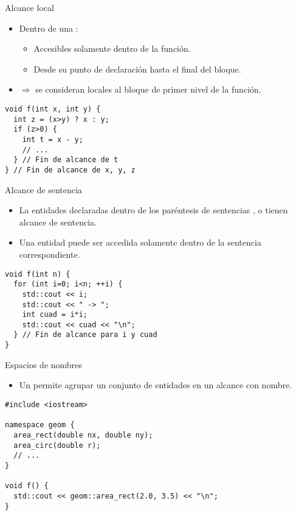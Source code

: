 \begin{frame}[t,fragile]{Alcance local}
\begin{itemize}
  \item Dentro de una :
    \begin{itemize}
      \item Accesibles solamente dentro de la función.
      \item Desde su punto de declaración hasta el final del bloque.
    \end{itemize}
  \item {} $\Rightarrow$ se consideran 
        locales al bloque de primer nivel de la función.
\end{itemize}
\begin{lstlisting}
void f(int x, int y) {
  int z = (x>y) ? x : y;
  if (z>0) {
    int t = x - y;
    // ...
  } // Fin de alcance de t
} // Fin de alcance de x, y, z
\end{lstlisting}
\end{frame}

\begin{frame}[t,fragile]{Alcance de sentencia}
\begin{itemize}
  \item La entidades declaradas dentro de los paréntesis de sentencias 
        ,  o 
        tienen alcance de sentencia.
  \item Una entidad puede ser accedida solamente dentro de la sentencia correspondiente.
\end{itemize}
\begin{lstlisting}
void f(int n) {
  for (int i=0; i<n; ++i) {
    std::cout << i;
    std::cout << " -> ";
    int cuad = i*i;
    std::cout << cuad << "\n";
  } // Fin de alcance para i y cuad
}
\end{lstlisting}
\end{frame}


\begin{frame}[t,fragile]{Espacios de nombres}
\begin{itemize}
  \item Un  
        permite agrupar un conjunto de entidades en un alcance con nombre.
\end{itemize}
\begin{lstlisting}
#include <iostream>

namespace geom {
  area_rect(double nx, double ny);
  area_circ(double r);
  // ...
}

void f() {
  std::cout << geom::area_rect(2.0, 3.5) << "\n";
}
\end{lstlisting}
\end{frame}


